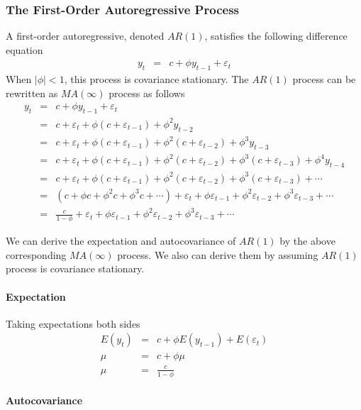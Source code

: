 \subsubsection{The First-Order Autoregressive Process}
A first-order autoregressive, denoted $AR(1)$, satisfies the following difference equation
\begin{eqnarray*}
y_{t}&=&c+\phi y_{t-1}+\varepsilon_{t}
\end{eqnarray*}
When $|\phi|<1$, this process is covariance stationary. The $AR(1)$ process can be rewritten as $MA(\infty)$ process as follows
\begin{eqnarray*}
y_{t}&=&c+\phi y_{t-1}+\varepsilon_{t}\\
&=&c+\varepsilon_{t}+\phi (c+\varepsilon_{t-1})+\phi^{2} y_{t-2}\\
&=&c+\varepsilon_{t}+\phi (c+\varepsilon_{t-1})+\phi^{2} (c+\varepsilon_{t-2})+\phi^{3} y_{t-3}\\
&=&c+\varepsilon_{t}+\phi (c+\varepsilon_{t-1})+\phi^{2} (c+\varepsilon_{t-2})+\phi^{3} (c+\varepsilon_{t-3})+\phi^{4} y_{t-4}\\
&=&c+\varepsilon_{t}+\phi (c+\varepsilon_{t-1})+\phi^{2} (c+\varepsilon_{t-2})+\phi^{3} (c+\varepsilon_{t-3})+\cdots\\
&=&(c+\phi c+\phi^{2}c+\phi^{3}c+\cdots)+\varepsilon_{t}+\phi\varepsilon_{t-1}+\phi^{2}\varepsilon_{t-2}+\phi^{3}\varepsilon_{t-3}+\cdots\\
&=&\frac{c}{1-\phi}+\varepsilon_{t}+\phi\varepsilon_{t-1}+\phi^{2}\varepsilon_{t-2}+\phi^{3}\varepsilon_{t-3}+\cdots
\end{eqnarray*}

We can derive the expectation and autocovariance of $AR(1)$ by the above corresponding $MA(\infty)$ process. We also can derive them by assuming $AR(1)$ process is covariance stationary.

\paragraph{Expectation}
Taking expectations both sides
\begin{eqnarray*}
E(y_{t})&=&c+\phi E(y_{t-1})+E(\varepsilon_{t})\\
\mu&=&c+\phi\mu\\
\mu&=&\frac{c}{1-\phi}
\end{eqnarray*}
\paragraph{Autocovariance}



